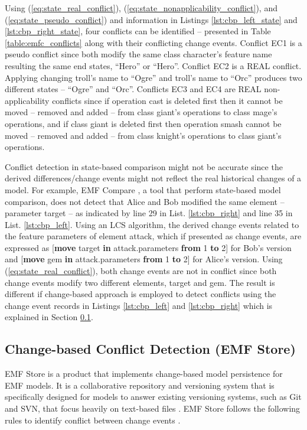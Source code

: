 Using (\ref{eq:state_real_conflict}), (\ref{eq:state_nonapplicability_conflict}), and (\ref{eq:state_pseudo_conflict}) and information in Listings \ref{lst:cbp_left_state} and \ref{lst:cbp_right_state}, four conflicts can be identified -- presented in Table \ref{table:emfc_conflicts} along with their conflicting change events. Conflict \textsf{EC1} is a \textsf{pseudo} conflict since both modify the same class \textsf{character}'s feature \textsf{name} resulting the same end states, ``Hero'' or ``Hero''. Conflict \textsf{EC2} is a \textsf{REAL} conflict. Applying changing \textsf{troll}'s \textsf{name} to ``Ogre'' and \textsf{troll}'s \textsf{name} to ``Orc'' produces two different states -- ``Ogre'' and ``Orc''. Conflicts \textsf{EC3} and \textsf{EC4} are \textsf{REAL} non-applicability conflicts since if operation \textsf{cast} is deleted first then it cannot be moved -- removed and added -- from class \textsf{giant}'s \textsf{operations} to class \textsf{mage}'s \textsf{operations}, and if class \textsf{giant} is deleted first then operation \textsf{smash} cannot be moved -- removed and added -- from  class \textsf{knight}'s \textsf{operations} to class \textsf{giant}'s \textsf{operations}.

Conflict detection in state-based comparison might not be accurate since the derived differences/change events might not reflect the real historical changes of a model. For example, EMF Compare \cite{emfcompare2018developer}, a tool that perform state-based model comparison, does not detect that Alice and Bob modified the same element -- parameter \textsf{target} -- as indicated by line 29 in List. \ref{lst:cbp_right} and line 35 in List. \ref{lst:cbp_left}. Using an LCS algorithm, the derived change events related to the feature \textsf{parameters} of element \textsf{attack}, which if presented as change events, are expressed as [\textsf{\small \textbf{move} target \textbf{in} attack.parameters \textbf{from} 1 \textbf{to} 2}] for Bob's version and [\textsf{\small \textbf{move} gem \textbf{in} attack.parameters \textbf{from} 1 \textbf{to} 2}] for Alice's version. Using (\ref{eq:state_real_conflict}), both change events are not in conflict since both change events modify two different elements, \textsf{target} and \textsf{gem}. The result is different if change-based approach is employed to detect conflicts using the change event records in Listings \ref{lst:cbp_left} and \ref{lst:cbp_right} which is explained in Section \ref{sec:emfstore_conflict_detection}.

\subsection{Change-based Conflict Detection (EMF Store)}
\label{sec:emfstore_conflict_detection}
EMF Store \cite{koegel2010emfstore} is a product that implements change-based model persistence for EMF models. It is a collaborative repository and versioning system that is specifically designed for models to answer existing versioning systems, such as Git and SVN, that focus heavily on text-based files \cite{emfstore2019what}. EMF Store follows the following rules to identify conflict between change events \cite{koegel2010operation}. 

